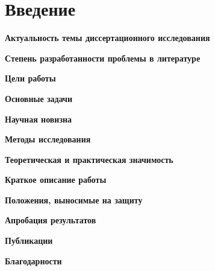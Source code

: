 \chapter*{Введение}
\label{Introduction}

\textbf{Актуальность темы диссертационного исследования}

\textbf{Степень разработанности проблемы в литературе}

\textbf{Цели работы}

\textbf{Основные задачи}

\textbf{Научная новизна}

\textbf{Методы исследования}

\textbf{Теоретическая и практическая значимость}

\textbf{Краткое описание работы}

\textbf{Положения, выносимые на защиту}

\textbf{Апробация результатов}

\textbf{Публикации}

\textbf{Благодарности}



